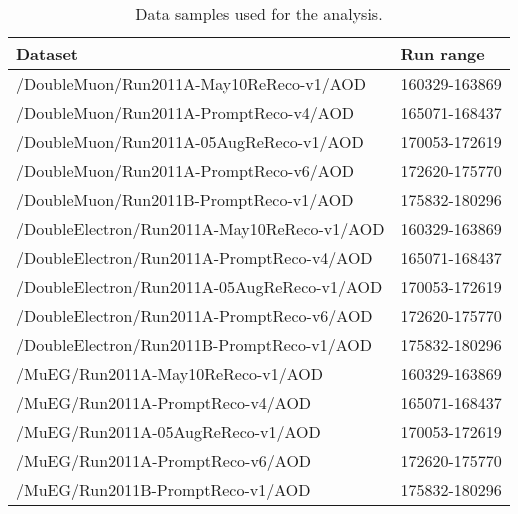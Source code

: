 \begin{table}[htb]
\centering
\begin{tabular}{ll}
    \toprule
Dataset & Run range  \\  
\midrule
/DoubleMuon/Run2011A-May10ReReco-v1/AOD & 160329-163869\\
/DoubleMuon/Run2011A-PromptReco-v4/AOD & 165071-168437 \\
/DoubleMuon/Run2011A-05AugReReco-v1/AOD & 170053-172619\\
/DoubleMuon/Run2011A-PromptReco-v6/AOD & 172620-175770\\
/DoubleMuon/Run2011B-PromptReco-v1/AOD & 175832-180296\\

/DoubleElectron/Run2011A-May10ReReco-v1/AOD & 160329-163869\\
/DoubleElectron/Run2011A-PromptReco-v4/AOD & 165071-168437 \\
/DoubleElectron/Run2011A-05AugReReco-v1/AOD & 170053-172619\\
/DoubleElectron/Run2011A-PromptReco-v6/AOD & 172620-175770\\
/DoubleElectron/Run2011B-PromptReco-v1/AOD & 175832-180296\\

/MuEG/Run2011A-May10ReReco-v1/AOD & 160329-163869\\
/MuEG/Run2011A-PromptReco-v4/AOD & 165071-168437 \\
/MuEG/Run2011A-05AugReReco-v1/AOD & 170053-172619\\
/MuEG/Run2011A-PromptReco-v6/AOD & 172620-175770\\
/MuEG/Run2011B-PromptReco-v1/AOD & 175832-180296\\
\bottomrule
\end{tabular}
\caption{Data samples used for the analysis.}
\label{tab:data_pd}
\end{table}
